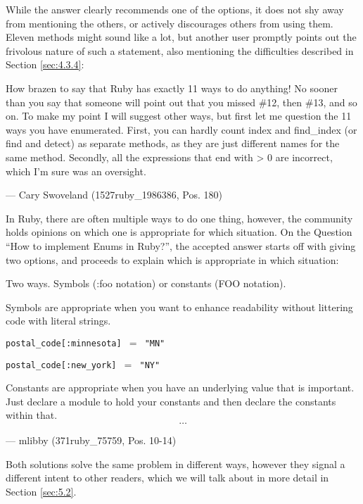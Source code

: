 While the answer clearly recommends one of the options, it does not shy away from mentioning the others, or actively
discourages others from using them. Eleven methods might sound like a lot, but another user promptly points out the
frivolous nature of such a statement, also mentioning the difficulties described in Section \ref{sec:4.3.4}:

\begin{displayquote}
    How brazen to say that Ruby has exactly 11 ways to do anything! No sooner than you say that someone will point out that
    you missed \#12, then \#13, and so on. To make my point I will suggest other ways, but first let me question the 11 ways
    you have enumerated. First, you can hardly count index and find\_index (or find and detect) as separate methods, as they
    are just different names for the same method. Secondly, all the expressions that end with > 0 are incorrect, which I'm
    sure was an oversight.

    --- Cary Swoveland (1527ruby\_1986386, Pos. 180)
\end{displayquote}

In Ruby, there are often multiple ways to do one thing, however, the community holds opinions on which one is appropriate
for which situation. On the Question “How to implement Enums in Ruby?”, the accepted answer starts off with giving two options,
and proceeds to explain which is appropriate in which situation:

\begin{displayquote}
    Two ways. Symbols (:foo notation) or constants (FOO notation).

    Symbols are appropriate when you want to enhance readability without littering code with literal strings.

    \texttt{postal\_code[:minnesota] $=$ "MN"}

    \texttt{postal\_code[:new\_york] $=$ "NY"}

    Constants are appropriate when you have an underlying value that is important. Just declare a module to hold your
    constants and then declare the constants within that. \[\ldots\]

    --- mlibby (371ruby\_75759, Pos. 10-14)

\end{displayquote}

Both solutions solve the same problem in different ways, however they signal a different intent to other readers,
which we will talk about in more detail in Section \ref{sec:5.2}.

